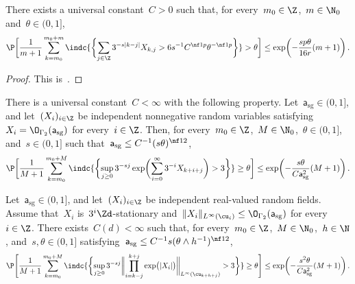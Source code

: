 \documentclass[11pt]{amsart}
\begin{document}
\begin{proposition}
\label{p.concentration.for.scales}
There exists a universal constant~$C > 0$ such that, for every~$m_0 \in \Z$,~$m \in\N_0$ and~$\theta \in (0,1]$,
\begin{equation*}
	\P \biggl[ \frac{1}{m+1} \sum_{k=m_0}^{m_0+m} \indc{\biggl\{ \sum_{j \in \Z} 3^{-s |k-j|} X_{k,j} > 6s^{-1} C^{\nf 1p} \theta^{-\nf 1p} \biggr\}} > \theta \biggr]
	\leq
	\exp \biggl(- \frac{  s p \theta}{16 r} (m+1)  \biggr)
	\,.
\end{equation*}
\end{proposition}
\begin{proof}
This is~\citet[Proposition~D.1]{ASD}.
\end{proof}

\begin{proposition}
\label{p.concentration.for.scales.exp.sequence}
There is a universal constant~$C<\infty$ with the following property. Let~$\mathsf a_{\mathrm{sg}}\in(0,1]$, and let~$(X_i)_{i\in\Z}$ be independent nonnegative random variables satisfying~$X_i=\O_{\Gamma_2}(\mathsf a_{\mathrm{sg}})$ for every~$i\in\Z$. Then, for every~$m_0\in\Z$,~$M\in\N_0$,~$\theta\in(0,1]$, and~$s\in(0,1]$ such that~$\mathsf a_{\mathrm{sg}}\leq C^{-1}(s\theta)^{\nf12}$,
\begin{equation}
	\P \biggl[ \frac{1}{M+1}\sum_{k=m_0}^{m_0+M}
	\indc{\biggl\{\sup_{j \geq 0}3^{- s j}
	\exp\biggl(\sum_{i=0}^\infty3^{-i}X_{k+i+j}\biggr)>3\biggr\}}
	\geq \theta \biggr]
	\leq
	\exp \biggl( - \frac{s\theta}{C\mathsf a_{\mathrm{sg}}^{2}}(M+1) \biggr)\,.
	\label{e.concentration.scales.exp.sequence}
\end{equation}
\end{proposition}

\begin{proposition}
\label{p.concentration.for.scales.exp.field}
Let~$\mathsf a_{\mathrm{sg}}\in(0,1]$, and let~$(X_i)_{i\in\Z}$ be independent real-valued random fields. Assume that~$X_i$ is~$3^i\Zd$-stationary and~$\|X_i\|_{L^\infty(\cu_i)}\leq\O_{\Gamma_2}(\mathsf a_{\mathrm{sg}})$ for every~$i\in\Z$. There exists~$C(d)<\infty$ such that, for every~$m_0\in\Z$,~$M\in\N_0$,~$h\in\N$, and~$s,\theta\in(0,1]$ satisfying~$\mathsf a_{\mathrm{sg}}\leq C^{-1}s(\theta\wedge h^{-1})^{\nf12}$,
\begin{equation}
	\P \Biggl[ \frac{1}{M+1}\sum_{k=m_0}^{m_0+M} \indc{\biggl\{ \sup_{j \geq 0}
	3^{- s j }
	\biggl\| \prod_{i=k - j}^{k+j} \exp\bigl(| X_i |\bigr) \biggr\|_{L^\infty(\cu_{k+h+j})}  > 3 \biggr\}} \geq \theta \Biggr]
	\leq
	\exp \biggl( - \frac{s^2 \theta}{C \mathsf a_{\mathrm{sg}}^2} (M+1) \biggr)
	\,.
	\label{e.concentration.scales.exp.field}
\end{equation}
\end{proposition}
\end{document}

